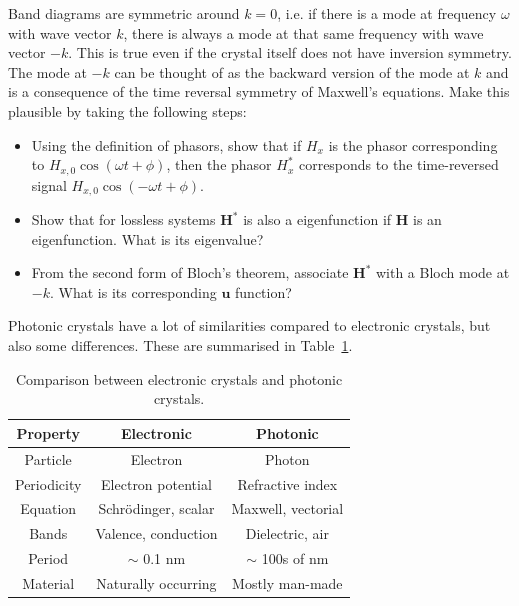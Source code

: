 \begin{exer}
Band diagrams are symmetric around $k=0$, i.e. if there is a mode at frequency $\omega$ with wave vector $k$, there is always a mode at that same frequency with wave vector $-k$. This is true even if the crystal itself does not have inversion symmetry. The mode at $-k$ can be thought of as the backward version of the mode at $k$ and is a consequence of the time reversal symmetry of Maxwell's equations. Make this plausible by taking the following steps:
\begin{itemize}
\item Using the definition of phasors, show that if $H_x$ is the phasor corresponding to $ H_{x,0} \cos \left( \omega t + \phi \right)$, then the phasor $H^*_x$ corresponds to the time-reversed signal $ H_{x,0} \cos \left(- \omega t + \phi  \right)$.
\item Show that for lossless systems ${\mathbf H}^*$ is also a eigenfunction if ${\mathbf H}$ is an eigenfunction. What is its eigenvalue?
\item From the second form of Bloch's theorem, associate ${\mathbf H}^*$ with a Bloch mode at $-k$. What is its corresponding ${\mathbf u}$ function?
\end{itemize}

\end{exer}

\pagebreak


Photonic crystals have a lot of similarities compared to electronic crystals, but also some differences. These are summarised in Table~\ref{tab-phot-cryst}.

\begin{table}[h!]
  \begin{center}
    \begin{tabular}{c|c|c} 
      \textbf{Property} & \textbf{Electronic} & \textbf{Photonic}\\
      \hline
      Particle & Electron & Photon \\
      Periodicity & Electron potential & Refractive index \\
      Equation & Schr\"{o}dinger, scalar & Maxwell, vectorial \\
      Bands & Valence, conduction & Dielectric, air \\
      Period & $\sim$ 0.1 nm & $\sim$ 100s of nm \\
      Material & Naturally occurring & Mostly man-made \\
    \end{tabular}
  \end{center}
  \caption{Comparison between electronic crystals and photonic crystals.}
  \label{tab-phot-cryst}
\end{table}


